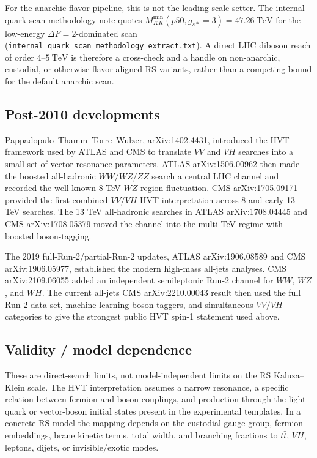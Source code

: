 For the anarchic-flavor pipeline, this is not the leading scale setter.  The
internal quark-scan methodology note quotes
\(M_{KK}^{\min}(p50,g_{s*}=3)=47.26~\mathrm{TeV}\) for the low-energy
\(\Delta F=2\)-dominated scan
(\texttt{internal\_quark\_scan\_methodology\_extract.txt}).  A direct LHC
diboson reach of order \(4\)--\(5~\mathrm{TeV}\) is therefore a cross-check and
a handle on non-anarchic, custodial, or otherwise flavor-aligned RS variants,
rather than a competing bound for the default anarchic scan.

\subsection*{Post-2010 developments}
Pappadopulo--Thamm--Torre--Wulzer, arXiv:1402.4431, introduced the HVT
framework used by ATLAS and CMS to translate \(VV\) and \(VH\) searches into a
small set of vector-resonance parameters.  ATLAS arXiv:1506.00962 then made the
boosted all-hadronic \(WW/WZ/ZZ\) search a central LHC channel and recorded the
well-known 8 TeV \(WZ\)-region fluctuation.  CMS arXiv:1705.09171 provided the
first combined \(VV/VH\) HVT interpretation across 8 and early 13 TeV searches.
The 13 TeV all-hadronic searches in ATLAS arXiv:1708.04445 and CMS
arXiv:1708.05379 moved the channel into the multi-TeV regime with boosted
boson-tagging.

The 2019 full-Run-2/partial-Run-2 updates, ATLAS arXiv:1906.08589 and CMS
arXiv:1906.05977, established the modern high-mass all-jets analyses.  CMS
arXiv:2109.06055 added an independent semileptonic Run-2 channel for \(WW\),
\(WZ\), and \(WH\).  The current all-jets CMS arXiv:2210.00043 result then used
the full Run-2 data set, machine-learning boson taggers, and simultaneous
\(VV/VH\) categories to give the strongest public HVT spin-1 statement used
above.

\subsection*{Validity / model dependence}
These are direct-search limits, not model-independent limits on the RS
Kaluza--Klein scale.  The HVT interpretation assumes a narrow resonance, a
specific relation between fermion and boson couplings, and production through
the light-quark or vector-boson initial states present in the experimental
templates.  In a concrete RS model the mapping depends on the custodial gauge
group, fermion embeddings, brane kinetic terms, total width, and branching
fractions to \(t\bar t\), \(VH\), leptons, dijets, or invisible/exotic modes.

